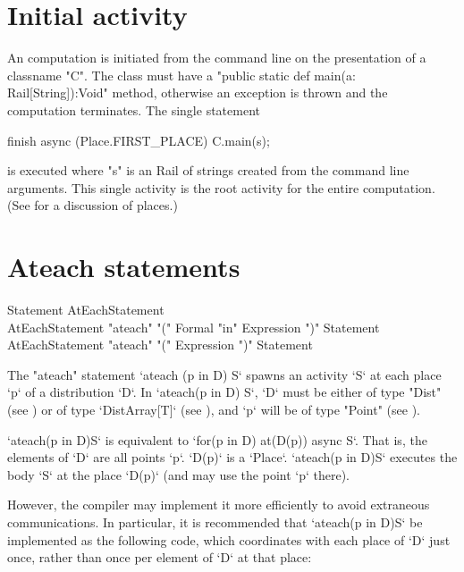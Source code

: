 \section{Initial activity}\label{initial-computation}

An \Xten{} computation is initiated from the command line on the
presentation of a classname \xcd"C". The class must have a
\xcd"public static def main(a: Rail[String]):Void" method, otherwise an
exception is thrown
and the computation terminates.  The single statement
\begin{xten}
finish async (Place.FIRST_PLACE) {
  C.main(s);
}
\end{xten} 
\noindent is executed where \xcd"s" is an Rail of strings created
from the command line arguments. This single activity is the root activity
for the entire computation. (See  for a discussion of
places.)





\section{Ateach statements}\label{ateach-section}

\begin{grammar}
Statement \: AtEachStatement \\
AtEachStatement \:
      \xcd"ateach" \xcd"(" Formal \xcd"in" Expression \xcd")"
         Statement \\
AtEachStatement \:
      \xcd"ateach" \xcd"(" Expression \xcd")"
         Statement 
\end{grammar}

The \xcd"ateach" statement \xcd`ateach (p in D) S`
spawns an activity \xcd`S` at each place \xcd`p` of a distribution \xcd`D`. 
In \xcd`ateach(p in D) S`, 
\xcd`D` must be either of type \xcd"Dist" 
(see )
or of type
\xcd`DistArray[T]` (see ), 
and \xcd`p` will be of type \xcd"Point" (see ).

\xcd`ateach(p in D)S` is equivalent to 
\xcd`for(p in D) at(D(p)) async S`.  That is, the elements of \xcd`D` are all
points \xcd`p`.  \xcd`D(p)` is a \xcd`Place`.  \xcd`ateach(p in D)S` executes
the body \xcd`S` at the place \xcd`D(p)` (and may use the point \xcd`p`
there). 


However, the compiler may implement it more efficiently to avoid extraneous
communications.  In particular, it is recommended that \xcd`ateach(p in D)S`
be implemented as the following code, which coordinates with each place of
\xcd`D` just once, rather than once per element of \xcd`D` at that place: 

